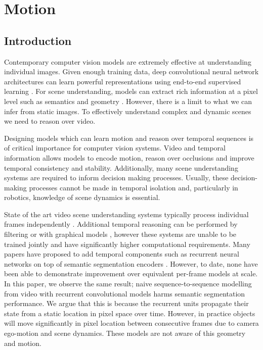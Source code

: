 \chapter{Motion}
\label{motion}

\graphicspath{{Chapter5/Figs/}}


\section{Introduction}
Contemporary computer vision models are extremely effective at understanding individual images. Given enough training data, deep convolutional neural network architectures can learn powerful representations using end-to-end supervised learning \cite{krizhevsky2012imagenet,he2016deep}. For scene understanding, models can extract rich information at a pixel level such as semantics \cite{long2015fully,badrinarayanan2017segnet,he2017maskrcnn} and geometry \cite{eigen2015predicting,garg2016unsupervised}.
However, there is a limit to what we can infer from static images. To effectively understand complex and dynamic scenes we need to reason over video.

Designing models which can learn motion and reason over temporal sequences is of critical importance for computer vision systems. Video and temporal information allows models to encode motion, reason over occlusions and improve temporal consistency and stability. Additionally, many scene understanding systems are required to inform decision making processes. Usually, these decision-making processes cannot be made in temporal isolation and, particularly in robotics, knowledge of scene dynamics is essential.

State of the art video scene understanding systems typically process individual frames independently \cite{he2017maskrcnn,zhao2017pspnet,eigen2015predicting,zhou2017unsupervised,patraucean2015spatio,valipour2017recurrent,gadde2017semantic}. Additional temporal reasoning can be performed by filtering \cite{miksik2013efficient} or with graphical models \cite{de2012line,chen2011temporally,tripathi2015semantic,hur2016joint}, however these systems are unable to be trained jointly and have significantly higher computational requirements. Many papers have proposed to add temporal components such as recurrent neural networks \cite{hochreiter1997long} on top of semantic segmentation encoders \cite{patraucean2015spatio,valipour2017recurrent}. However, to date, none have been able to demonstrate improvement over equivalent per-frame models at scale. In this paper, we observe the same result; naive sequence-to-sequence modelling from video with recurrent convolutional models harms semantic segmentation performance. We argue that this is because the recurrent units propagate their state from a static location in pixel space over time. However, in practice objects will move significantly in pixel location between consecutive frames due to camera ego-motion and scene dynamics. These models are not aware of this geometry and motion.

